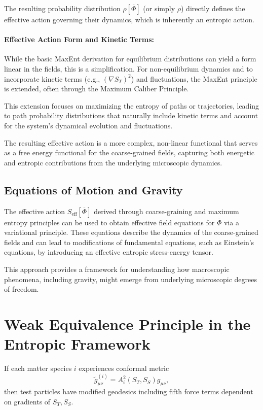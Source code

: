 \documentclass[12pt, a4paper]{article}
\begin{document}
The resulting probability distribution $\rho[\overline{\Phi}]$ (or simply $\rho$) directly defines the effective action governing their dynamics, which is inherently an entropic action.

\paragraph{Effective Action Form and Kinetic Terms:}
While the basic MaxEnt derivation for equilibrium distributions can yield a form linear in the fields, this is a simplification. For non-equilibrium dynamics and to incorporate kinetic terms (e.g., $(\nabla S_T)^2$) and fluctuations, the MaxEnt principle is extended, often through the Maximum Caliber Principle.

This extension focuses on maximizing the entropy of paths or trajectories, leading to path probability distributions that naturally include kinetic terms and account for the system's dynamical evolution and fluctuations.

The resulting effective action is a more complex, non-linear functional that serves as a free energy functional for the coarse-grained fields, capturing both energetic and entropic contributions from the underlying microscopic dynamics.

\subsection{Equations of Motion and Gravity}

The effective action $S_{\mathrm{eff}}[\overline{\Phi}]$ derived through coarse-graining and maximum entropy principles can be used to obtain effective field equations for $\overline{\Phi}$ via a variational principle. These equations describe the dynamics of the coarse-grained fields and can lead to modifications of fundamental equations, such as Einstein's equations, by introducing an effective entropic stress-energy tensor.

This approach provides a framework for understanding how macroscopic phenomena, including gravity, might emerge from underlying microscopic degrees of freedom.
\section{Weak Equivalence Principle in the Entropic Framework}

If each matter species $i$ experiences conformal metric
\[
\tilde{g}_{\mu\nu}^{(i)} = A_i^2(S_T, S_S) g_{\mu\nu},
\]
then test particles have modified geodesics including fifth force terms dependent on gradients of $S_T, S_S$.
\end{document}

